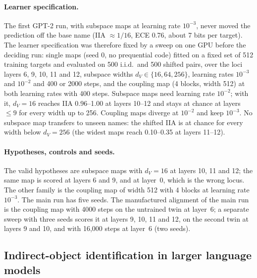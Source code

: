 \documentclass[11pt,a4paper]{article}
\newcommand{\dv}{d_V}
\begin{document}
\paragraph{Learner specification.} The first GPT-2 run, with subspace maps at learning rate $10^{-3}$, never moved the prediction off the base name (IIA $\approx1/16$, ECE 0.76, about 7 bits per target). The learner specification was therefore fixed by a sweep on one GPU before the deciding run: single maps (seed 0, no prequential code) fitted on a fixed set of 512 training targets and evaluated on 500 i.i.d.\ and 500 shifted pairs, over the loci layers 6, 9, 10, 11 and 12, subspace widths $\dv\in\{16,64,256\}$, learning rates $10^{-3}$ and $10^{-2}$ and 400 or 2000 steps, and the coupling map (4 blocks, width 512) at both learning rates with 400 steps. Subspace maps need learning rate $10^{-2}$; with it, $\dv=16$ reaches IIA 0.96--1.00 at layers 10--12 and stays at chance at layers $\le 9$ for every width up to 256. Coupling maps diverge at $10^{-2}$ and keep $10^{-3}$. No subspace map transfers to unseen names: the shifted IIA is at chance for every width below $\dv=256$ (the widest maps reach 0.10--0.35 at layers 11--12).

\paragraph{Hypotheses, controls and seeds.} The valid hypotheses are subspace maps with $\dv=16$ at layers 10, 11 and 12; the same map is scored at layers 6 and 9, and at layer~0, which is the wrong locus. The other family is the coupling map of width 512 with 4 blocks at learning rate $10^{-3}$. The main run has five seeds. The manufactured alignment of the main run is the coupling map with 4000 steps on the untrained twin at layer~6; a separate sweep with three seeds scores it at layers 9, 10, 11 and 12, on the second twin at layers 9 and 10, and with 16{,}000 steps at layer~6 (two seeds).

\subsection{Indirect-object identification in larger language models}
\label{sec:tb:ioilm}
\end{document}
